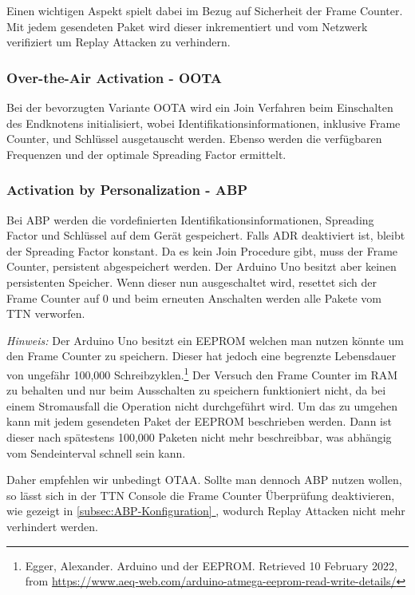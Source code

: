 \documentclass[12pt]{article}
\newcommand*{\fullref}[1]{\hyperref[{#1}]{\ref{#1} \nameref{#1}}}   %
\begin{document}
      Einen wichtigen Aspekt spielt dabei im Bezug auf Sicherheit der Frame Counter. Mit jedem gesendeten Paket wird dieser inkrementiert
      und vom Netzwerk verifiziert um Replay Attacken zu verhindern.

      \subsubsection{Over-the-Air Activation - OOTA}
        Bei der bevorzugten Variante OOTA wird ein Join Verfahren beim Einschalten des Endknotens initialisiert,
        wobei Identifikationsinformationen, inklusive Frame Counter, und Schlüssel ausgetauscht werden. Ebenso werden die verfügbaren Frequenzen und
        der optimale Spreading Factor ermittelt.

      \subsubsection{Activation by Personalization - ABP}
        Bei ABP werden die vordefinierten Identifikationsinformationen, Spreading Factor und Schlüssel auf dem Gerät gespeichert.
        Falls ADR deaktiviert ist, bleibt der Spreading Factor konstant. Da es kein Join Procedure gibt, muss der Frame Counter,
        persistent abgespeichert werden. Der Arduino Uno besitzt aber keinen persistenten Speicher. Wenn dieser nun ausgeschaltet wird, resettet sich der Frame
        Counter auf 0 und beim erneuten Anschalten werden alle Pakete vom TTN verworfen. 

        \textit{Hinweis:} Der Arduino Uno besitzt ein EEPROM welchen man nutzen könnte um den Frame Counter zu speichern. Dieser hat jedoch eine begrenzte
        Lebensdauer von ungefähr 100,000 Schreibzyklen.\footnote[2]{Egger, Alexander. Arduino und der EEPROM. Retrieved 10 February 2022, from \href{https://www.aeq-web.com/arduino-atmega-eeprom-read-write-details/}{https://www.aeq-web.com/arduino-atmega-eeprom-read-write-details/}}
        Der Versuch den Frame Counter im RAM zu behalten und nur beim Ausschalten zu speichern funktioniert nicht, da bei einem Stromausfall
        die Operation nicht durchgeführt wird. Um das zu umgehen kann mit jedem gesendeten Paket der EEPROM beschrieben werden. Dann ist dieser nach
        spätestens 100,000 Paketen nicht mehr beschreibbar, was abhängig vom Sendeinterval schnell sein kann.

        Daher empfehlen wir unbedingt OTAA. Sollte man dennoch ABP nutzen wollen, so lässt sich in der TTN Console die Frame Counter Überprüfung deaktivieren,
        wie gezeigt in \underline{\fullref{subsec:ABP-Konfiguration}}, wodurch Replay Attacken nicht mehr verhindert werden.
\end{document}
